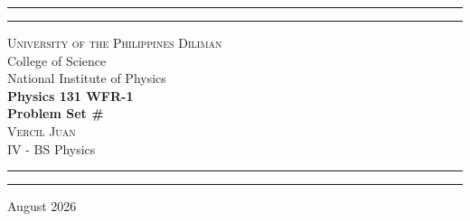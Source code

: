 \begin{titlepage}
    \vspace*{2.5in}
    \hrule
    \vspace{3pt}
    \hrule
    \vspace{0.25in}
    \begin{center}
		{
			\Large 
			\textsc{
				University of the Philippines Diliman
			}
			\\[4pt]
			College of Science
			\\[4pt]
			National Institute of Physics
		}
		\\[0.5cm]
		{
			\Huge
			\textbf{
				Physics 131 WFR-1
				\\[5pt]
				Problem Set \#
			}
		}
		\\[0.75cm]
		{
			\Large 
			\textsc{
				Vercil Juan
			}
		}\\[5pt] 
		{
			\large 
			IV - BS Physics
		}
    \end{center}
    \vspace{0.25in}
    \hrule
    \vspace{3pt}
    \hrule 
    \vfill
    \begin{center}
    {\large 
		August 2026
	}
    \end{center}
\end{titlepage}
